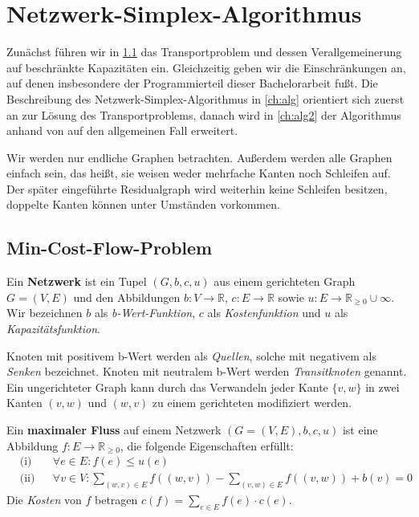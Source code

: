 \chapter{Netzwerk-Simplex-Algorithmus}\label{ch:NSA}
Zunächst führen wir in \cref{ch:MCF} das Transportproblem und dessen Verallgemeinerung auf beschränkte Kapazitäten ein. Gleichzeitig geben wir die Einschränkungen an, auf denen insbesondere der Programmierteil dieser Bachelorarbeit fußt. Die Beschreibung des Netzwerk-Simplex-Algorithmus in \cref{ch:alg} orientiert sich zuerst an \cite[S. 291\,ff.]{NSAbook} zur Lösung des Transportproblems, danach wird in \cref{ch:alg2} der Algorithmus anhand von \cite[S. 353\,ff.]{NSAbook} auf den allgemeinen Fall erweitert.

Wir werden nur endliche Graphen betrachten. Außerdem werden alle Graphen einfach sein, das heißt, sie weisen weder mehrfache Kanten noch Schleifen auf. Der später eingeführte Residualgraph wird weiterhin keine Schleifen besitzen, doppelte Kanten können unter Umständen vorkommen.

\section{Min-Cost-Flow-Problem}\label{ch:MCF}
\begin{defn}Ein \textbf{Netzwerk} ist ein Tupel $(G,b,c,u)$ aus einem gerichteten Graph $G = (V,E)$ und den Abbildungen $b : V\rightarrow\mathbb{R}$, $c : E\rightarrow\mathbb{R}$ sowie $u : E\rightarrow\mathbb{R}_{\geq 0}\cup \infty$. Wir bezeichnen $b$ als \emph{b-Wert-Funktion}, $c$ als \emph{Kostenfunktion} und $u$ als \emph{Kapazitätsfunktion}.\end{defn}
\begin{anm}Knoten mit positivem b-Wert werden als \emph{Quellen}, solche mit negativem als \emph{Senken} bezeichnet. Knoten mit neutralem b-Wert werden \emph{Transitknoten} genannt. Ein ungerichteter Graph kann durch das Verwandeln jeder Kante $\{v,w\}$ in zwei Kanten $(v,w)$ und $(w,v)$ zu einem gerichteten modifiziert werden.\end{anm}

\begin{defn}\label{DefMaxFlow}Ein \textbf{maximaler Fluss} auf einem Netzwerk $(G=(V,E),b,c,u)$ ist eine Abbildung $f : E\rightarrow\mathbb{R}_{\geq 0}$, die folgende Eigenschaften erfüllt:
\begin{align}
&\text{(i)}&&\forall e\in E : f(e)\leq u(e)\nonumber\\
&\text{(ii)}&&\forall v\in V : \sum_{(w,v)\in E} f((w,v)) - \sum_{(v,w)\in E} f((v,w)) + b(v) = 0\label{DefMaxFlowII}
\end{align}
Die \emph{Kosten} von $f$ betragen $c(f) = \sum_{e\in E} f(e)\cdot c(e)$.
\end{defn}

